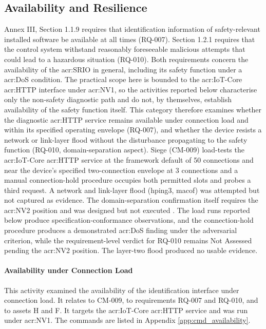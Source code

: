 \subsection{Availability and Resilience}
\label{subsec:cat_availability} 
Annex III, Section 1.1.9 requires that identification information of safety-relevant installed software be available at all times (RQ-007). Section 1.2.1 requires that the control system withstand reasonably foreseeable malicious attempts that could lead to a hazardous situation (RQ-010). Both requirements concern the availability of the \gls{acr:SRIO} in general, including its safety function under a \gls{acr:DoS} condition. The practical scope here is bounded to the \gls{acr:IoT}-Core \gls{acr:HTTP} interface under \gls{acr:NV1}, so the activities reported below characterise only the non-safety diagnostic path and do not, by themselves, establish availability of the safety function itself.
This category therefore examines whether the diagnostic \gls{acr:HTTP} service remains available under connection load and within its specified operating envelope (RQ-007), and whether the device resists a network or link-layer flood without the disturbance propagating to the safety function (RQ-010, domain-separation aspect). Siege (CM-009) load-tests the \gls{acr:IoT}-Core \gls{acr:HTTP} service at the framework default of 50 connections and near the device's specified two-connection envelope at 3 connections and a manual connection-hold procedure occupies both permitted slots and probes a third request. A network and link-layer flood (hping3, macof) was attempted but not captured as evidence. The domain-separation confirmation itself requires the \gls{acr:NV2} position and was designed but not executed \cite{macof_man} \cite{kali_hping3}. The load runs reported below produce specification-conformance observations, and the connection-hold procedure produces a demonstrated \gls{acr:DoS} finding under the adversarial criterion, while the requirement-level verdict for RQ-010 remains Not Assessed pending the \gls{acr:NV2} position. The layer-two flood produced no usable evidence.

\paragraph{Availability under Connection Load}
\label{subsec:res_availability}
This activity examined the availability of the identification interface under connection load. It relates to CM-009, to requirements RQ-007 and RQ-010, and to assets H and F. It targets the \gls{acr:IoT}-Core \gls{acr:HTTP} service and was run under \gls{acr:NV1}. The commands are listed in Appendix \ref{app:cmd_availability}.

